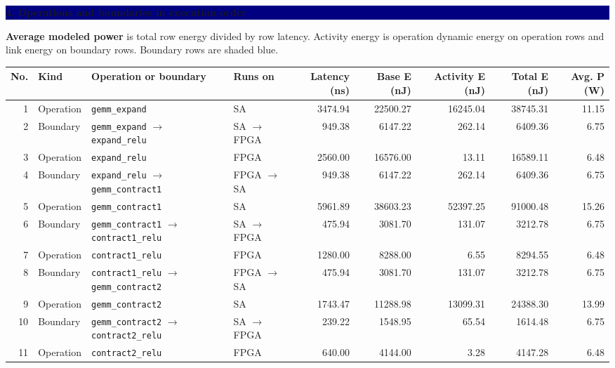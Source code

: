 \documentclass[10pt]{article}
\newcommand{\sectionbar}[1]{\vspace{0.5em}\noindent
  \colorbox{navy}{\parbox{\dimexpr\linewidth-2\fboxsep\relax}{
  \color{white}\large\bfseries #1}}\par\vspace{0.35em}}
\begin{document}
\clearpage
\begin{landscape}
\sectionbar{4. Operations and boundaries in execution order}

\textbf{Average modeled power} is total row energy divided by row latency.
Activity energy is operation dynamic energy on operation rows and link energy
on boundary rows.  Boundary rows are shaded blue.

\footnotesize
\setlength{\tabcolsep}{3.5pt}
\begin{tabularx}{\linewidth}{@{}r l Y l r r r r r@{}}
\toprule
\textbf{No.} & \textbf{Kind} & \textbf{Operation or boundary} &
\textbf{Runs on} & \textbf{Latency (ns)} & \textbf{Base E (nJ)} &
\textbf{Activity E (nJ)} & \textbf{Total E (nJ)} & \textbf{Avg. P (W)} \\
 & Operation & \texttt{gemm\_expand} & SA & 3474.94 & 22500.27 & 16245.04 & 38745.31 & 11.15 \\
2 & Boundary & \texttt{gemm\_expand} $\rightarrow$ \texttt{expand\_relu} & SA $\rightarrow$ FPGA & 949.38 & 6147.22 & 262.14 & 6409.36 & 6.75 \\
3 & Operation & \texttt{expand\_relu} & FPGA & 2560.00 & 16576.00 & 13.11 & 16589.11 & 6.48 \\
4 & Boundary & \texttt{expand\_relu} $\rightarrow$ \texttt{gemm\_contract1} & FPGA $\rightarrow$ SA & 949.38 & 6147.22 & 262.14 & 6409.36 & 6.75 \\
5 & Operation & \texttt{gemm\_contract1} & SA & 5961.89 & 38603.23 & 52397.25 & 91000.48 & 15.26 \\
6 & Boundary & \texttt{gemm\_contract1} $\rightarrow$ \texttt{contract1\_relu} & SA $\rightarrow$ FPGA & 475.94 & 3081.70 & 131.07 & 3212.78 & 6.75 \\
7 & Operation & \texttt{contract1\_relu} & FPGA & 1280.00 & 8288.00 & 6.55 & 8294.55 & 6.48 \\
8 & Boundary & \texttt{contract1\_relu} $\rightarrow$ \texttt{gemm\_contract2} & FPGA $\rightarrow$ SA & 475.94 & 3081.70 & 131.07 & 3212.78 & 6.75 \\
9 & Operation & \texttt{gemm\_contract2} & SA & 1743.47 & 11288.98 & 13099.31 & 24388.30 & 13.99 \\
10 & Boundary & \texttt{gemm\_contract2} $\rightarrow$ \texttt{contract2\_relu} & SA $\rightarrow$ FPGA & 239.22 & 1548.95 & 65.54 & 1614.48 & 6.75 \\
11 & Operation & \texttt{contract2\_relu} & FPGA & 640.00 & 4144.00 & 3.28 & 4147.28 & 6.48 \\

\end{tabularx}
\end{landscape}
\end{document}

